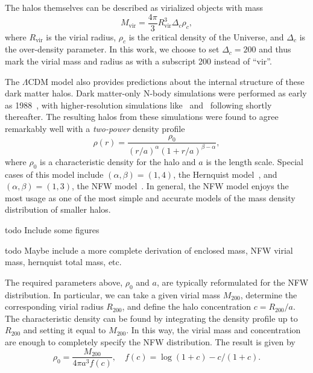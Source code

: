 The halos themselves can be described as virialized objects with mass
\begin{equation}
M_{\text{vir}} = \frac{4\pi}{3} R_{\text{vir}}^3 \Delta_c \rho_c,
\end{equation}
where \(R_{\text{vir}}\) is the virial radius, \(\rho_c\) is the
critical density of the Universe, and \(\Delta_c\) is the over-density
parameter. In this work, we choose to set \(\Delta_c = 200\) and thus
mark the virial mass and radius as with a subscript 200 instead of
``vir''.

The \(\Lambda\)CDM model also provides predictions about the internal
structure of these dark matter halos. Dark matter-only N-body simulations were
performed as early as 1988~\cite{frenk_formation_1988}, with higher-resolution
simulations like~\cite{dubinski_structure_1991}
and~\cite{navarro_structure_1995} following shortly thereafter. The resulting
halos from these simulations were found to agree remarkably well with a
\emph{two-power} density profile~\cite{binney_galactic_2008} 
\begin{equation} \label{eq:twopower}
\rho(r) = \frac{\rho_0}{(r/a)^\alpha (1 + r/a)^{\beta-\alpha}}, 
\end{equation}
where \(\rho_0\) is a characteristic density for the halo and \(a\) is the
length scale. Special cases of this model include \((\alpha,\beta) = (1,4)\),
the Hernquist model~\cite{hernquist_analytical_1990}, and \((\alpha,\beta) =
(1,3)\), the NFW model~\cite{navarro_structure_1995,navarro_universal_1997}.
In general, the NFW model enjoys the most usage as one of the most simple and
accurate models of the mass density distribution of smaller halos.

todo Include some figures

todo Maybe include a more complete derivation of enclosed mass, NFW virial mass,
hernquist total mass, etc.

The required parameters above, \(\rho_0\) and \(a\), are typically
reformulated for the NFW distribution. In particular, we can take a
given virial mass \(M_{200}\), determine the corresponding virial radius
\(R_{200}\), and define the halo concentration \(c = R_{200} / a\). The
characteristic density can be found by integrating the density profile
up to \(R_{200}\) and setting it equal to \(M_{200}\). In this way, the
virial mass and concentration are enough to completely specify the NFW
distribution. The result is given by
\begin{equation}
\rho_0 = \frac{M_{200}}{4 \pi a^3 f(c)}, \quad 
f(c) = \log(1+c) - c/(1+c).
\end{equation}

